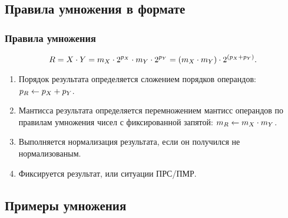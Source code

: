 \subsection{Правила умножения в формате}


\begin{frame}
    \frametitle{Правила умножения}

    \[R=X\cdot Y=m_{X}\cdot {2}^{p_{X}}\cdot m_{Y}\cdot {2}^{p_{Y}}=(m_{X}\cdot m_{Y})\cdot 2^{(p_{X}+p_{Y})}.\]
        
    \begin{enumerate}
        \item Порядок результата определяется сложением порядков операндов: $p_{R}\gets p_{X}+p_{Y}$.  
        \item Мантисса результата определяется перемножением мантисс операндов по правилам умножения чисел с фиксированной запятой: $m_{R}\gets m_{X}\cdot m_{Y}$.
        \item Выполняется нормализация результата, если он получился не нормализованым.
        \item Фиксируется результат, или ситуации ПРС/ПМР.
    \end{enumerate}
\end{frame}


\subsection{Примеры умножения}


